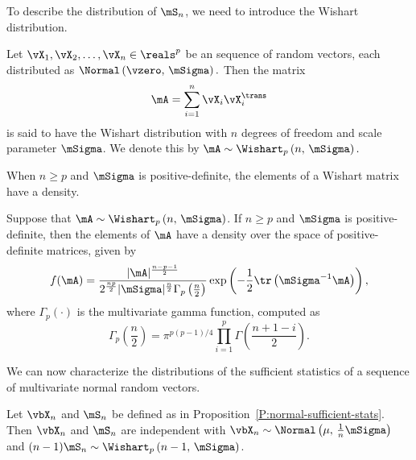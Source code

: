 To describe the distribution of $\mS_n$, we need to introduce the 
Wishart distribution.

\begin{definition}\label{D:wishart}
Let $\vX_1, \vX_2, \ldots, \vX_n \in \reals^p$ be an \iid sequence of
random vectors, each distributed as
\(
    \Normal \left(
        \vzero, \,
        \mSigma
    \right).
\)
Then the matrix
\[
    \mA = \sum_{i=1}^n \vX_i \vX_i^\trans
\]
is said to have the Wishart distribution with $n$ degrees of freedom and scale parameter $\mSigma$.  We denote this by
\(
    \mA
    \sim
    \Wishart_p \left(
        n, \,
        \mSigma
    \right).
\)
\end{definition}

\noindent
When $n \geq p$ and $\mSigma$ is positive-definite, the elements of a Wishart matrix have a density.
\begin{proposition}
Suppose that
\(
    \mA
    \sim
    \Wishart_p \left(
        n, \,
        \mSigma
    \right)
\).
If $n \geq p$ and $\mSigma$ is positive-definite, then the elements of $\mA$ have a density over the space of positive-definite matrices, given by
\begin{equation}\label{E:wishart-density}
    f( \mA )
    =
    \frac{ |\mA|^\frac{n-p-1}{2} }
         { 2^\frac{np}{2} 
           |\mSigma|^\frac{n}{2} 
           \Gamma_p \left( \frac{n}{2} \right) }
    \exp \left(
        -
        \frac{1}{2}
        \tr \left(
            \mSigma^{-1} \mA
        \right)
    \right),
\end{equation}
where
\(
    \Gamma_p \left( \cdot \right)
\)
is the multivariate gamma function, computed as
\begin{equation}
    \Gamma_p \left( \frac{n}{2} \right)
    =
    \pi^{p(p-1)/4}
    \prod_{i=1}^p
        \Gamma \left(
            \frac{n + 1 - i}{2}
        \right).
\end{equation}
\end{proposition}

We can now characterize the distributions of the sufficient statistics of a sequence of \iid multivariate normal random vectors.

\begin{proposition}
Let 
\(
    \vbX_n
\) 
and 
\(
    \mS_n
\)
be defined as in Proposition~\ref{P:normal-sufficient-stats}.  Then
\(
    \vbX_n
\)
and
\(
    \mS_n
\)
are independent with
\(
    \vbX_n
    \sim
    \Normal \left(
        \mu, \,
        \frac{1}{n}
        \mSigma
    \right)
\)
and
\(
    (n-1)
    \mS_n
    \sim
    \Wishart_p \left(
        n-1, \,
        \mSigma
    \right)
\).
\end{proposition}

